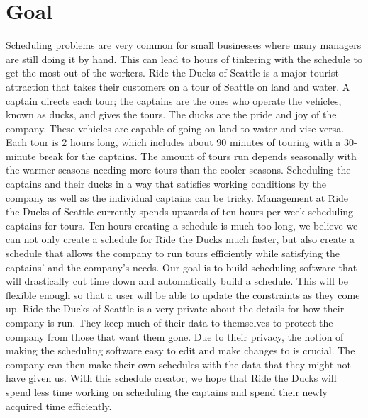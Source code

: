 \documentclass[12pt]{article}
\begin{document}
\section*{Goal}
Scheduling problems are very common for small businesses where many managers are
still doing it by hand. This can lead to hours of tinkering with the schedule to get the most 
out of the workers. Ride the Ducks of Seattle is a major tourist attraction that takes their 
customers on a tour of Seattle on land and water. A captain directs each tour; the captains 
are the ones who operate the vehicles, known as ducks, and gives the tours. The ducks are 
the pride and joy of the company. These vehicles are capable of going on land to water 
and vise versa. Each tour is 2 hours long, which includes about 90 minutes of touring 
with a 30-minute break for the captains. The amount of tours run depends seasonally with 
the warmer seasons needing more tours than the cooler seasons. Scheduling the captains 
and their ducks in a way that satisfies working conditions by the company as well as the 
individual captains can be tricky. Management at Ride the Ducks of Seattle currently 
spends upwards of ten hours per week scheduling captains for tours. Ten hours creating a 
schedule is much too long, we believe we can not only create a schedule for Ride the 
Ducks much faster, but also create a schedule that allows the company to run tours 
efficiently while satisfying the captains’ and the company’s needs. Our goal is to build 
scheduling software that will drastically cut time down and automatically build a 
schedule. This will be flexible enough so that a user will be able to update the constraints
as they come up. Ride the Ducks of Seattle is a very private about the details for how 
their company is run. They keep much of their data to themselves to protect the company 
from those that want them gone. Due to their privacy, the notion of making the 
scheduling software easy to edit and make changes to is crucial. The company can then 
make their own schedules with the data that they might not have given us. With this 
schedule creator, we hope that Ride the Ducks will spend less time working on 
scheduling the captains and spend their newly acquired time efficiently. 
\end{document}
